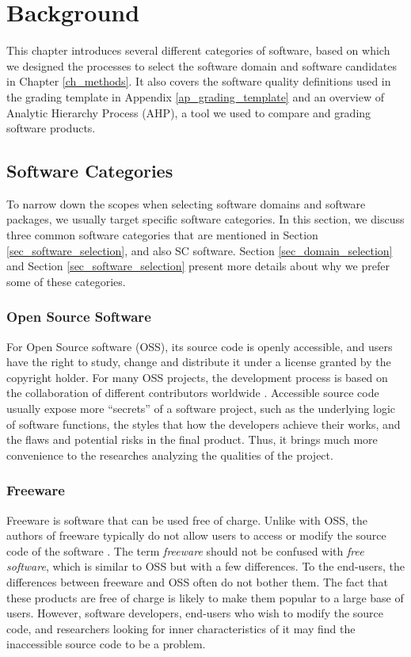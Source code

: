 \chapter{Background}
\label{ch_background}

This chapter introduces several different categories of software, based on which we designed the processes to select the software domain and software candidates in Chapter \ref{ch_methods}. It also covers the software quality definitions used in the grading template in Appendix \ref{ap_grading_template} and an overview of Analytic Hierarchy Process (AHP), a tool we used to compare and grading software products.

\section{Software Categories}
To narrow down the scopes when selecting software domains and software packages, we usually target specific software categories. In this section, we discuss three common software categories that are mentioned in Section \ref{sec_software_selection}, and also SC software. Section \ref{sec_domain_selection} and Section \ref{sec_software_selection} present more details about why we prefer some of these categories.

\subsection{Open Source Software}
\label{sec_open_source_software}
For Open Source software (OSS), its source code is openly accessible, and users have the right to study, change and distribute it under a license granted by the copyright holder. For many OSS projects, the development process is based on the collaboration of different contributors worldwide \cite{Corbly2014}. Accessible source code usually expose more ``secrets'' of a software project, such as the underlying logic of software functions, the styles that how the developers achieve their works, and the flaws and potential risks in the final product. Thus, it brings much more convenience to the researches analyzing the qualities of the project.

\subsection{Freeware}
\label{sec_freeware}
Freeware is software that can be used free of charge. Unlike with OSS, the authors of freeware typically do not allow users to access or modify the source code of the software \cite{LINFO2006}. The term \textit{freeware} should not be confused with \textit{free software}, which is similar to OSS but with a few differences. To the end-users, the differences between freeware and OSS often do not bother them. The fact that these products are free of charge is likely to make them popular to a large base of users. However, software developers, end-users who wish to modify the source code, and researchers looking for inner characteristics of it may find the inaccessible source code to be a problem. 

